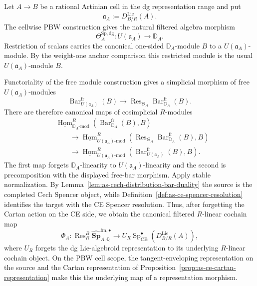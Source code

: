 \begin{construction}
\label{con:as-cellwise-ce-spencer-map}
Let $A\to B$ be a rational Artinian cell in the dg representation range and
put
\[
    \mathfrak a_A:=D_{B/R}^{\mathrm{Lie}}(A).
\]
The cellwise PBW construction gives the natural filtered algebra morphism
\[
    \Theta_A^{\mathrm{Sp,dg}}:
    U(\mathfrak a_A)
    \longrightarrow
    \mathbb D_A.
\]
Restriction of scalars carries the canonical one-sided $\mathbb D_A$-module
$B$ to a $U(\mathfrak a_A)$-module.  By the weight-one anchor comparison this
restricted module is the usual $U(\mathfrak a_A)$-module $B$.

Functoriality of the free module construction gives a simplicial morphism of
free $U(\mathfrak a_A)$-modules
\[
\boxed{
    \operatorname{Bar}^{\mathrm{fr}}_{U(\mathfrak a_A)}(B)
    \longrightarrow
    \operatorname{Res}_{\Theta_A}
    \operatorname{Bar}^{\mathrm{fr}}_{\mathbb D_A}(B).
}
\]
There are therefore canonical maps of cosimplicial $R$-modules
\[
\begin{aligned}
&
\underline{\operatorname{Hom}}^R_{\mathbb D_A\text{-}\mathrm{mod}}
\left(
    \operatorname{Bar}^{\mathrm{fr}}_{\mathbb D_A}(B),B
\right)\\
&\qquad\longrightarrow
\underline{\operatorname{Hom}}^R_{U(\mathfrak a_A)\text{-}\mathrm{mod}}
\left(
    \operatorname{Res}_{\Theta_A}
    \operatorname{Bar}^{\mathrm{fr}}_{\mathbb D_A}(B),B
\right)\\
&\qquad\longrightarrow
\underline{\operatorname{Hom}}^R_{U(\mathfrak a_A)\text{-}\mathrm{mod}}
\left(
    \operatorname{Bar}^{\mathrm{fr}}_{U(\mathfrak a_A)}(B),B
\right).
\end{aligned}
\]
The first map forgets $\mathbb D_A$-linearity to
$U(\mathfrak a_A)$-linearity and the second is precomposition with the
displayed free-bar morphism.  Apply stable normalization.  By
Lemma~\ref{lem:as-cech-distribution-bar-duality} the source is the completed
Cech Spencer object, while
Definition~\ref{def:as-ce-spencer-resolution} identifies the target with the
CE Spencer resolution.  Thus, after forgetting the Cartan action on the CE side, we obtain the
canonical filtered $R$-linear cochain map
\[
\boxed{
    \Phi_A:
    \operatorname{Res}_R^B
    \widehat{\mathbf{Sp}}_{A,\mathbb Q}^{\mathrm{fm},\bullet}
    \longrightarrow
    U_R
    \operatorname{Sp}_{\mathrm{CE}}^{\bullet}
    \left(
        D_{B/R}^{\mathrm{Lie}}(A)
    \right),
}
\]
where $U_R$ forgets the dg Lie-algebroid representation to its underlying
$R$-linear cochain object.  On the PBW cell scope, the tangent-enveloping
representation on the source and the Cartan representation of
Proposition~\ref{prop:as-ce-cartan-representation} make this the underlying
map of a representation morphism.
\end{construction}


